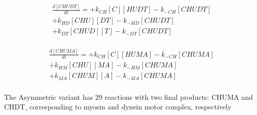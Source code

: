 \begin{equation}
\begin{split}
\frac{d[CHUDT]}{dt} = + k_{CH}[C][HUDT] - k_{-CH}[CHUDT]  \\%
                      + k_{HD}[CHU][DT] - k_{-HD}[CHUDT]  \\%
                      + k_{DT}[CHUD][T] - k_{-DT}[CHUDT]  \\%
\end{split}
\end{equation}

\begin{equation}
\begin{split}
\frac{d[CHUMA]}{dt} = + k_{CH}[C][HUMA] - k_{-CH}[CHUMA]  \\%
                      + k_{HM}[CHU][MA] - k_{-HM}[CHUMA]  \\%
                      + k_{MA}[CHUM][A] - k_{-MA}[CHUMA]  \\%
\end{split}
\end{equation}

The Asymmetric variant has 29 reactions with two final products: CHUMA and CHDT, corresponding to myosin and dynein motor complex, respectively

